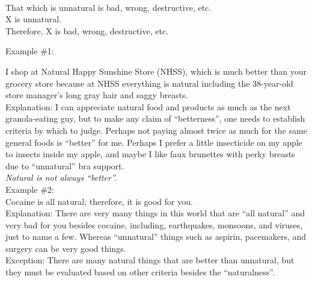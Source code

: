 \documentclass[a4paper,12pt,single,pdftex]{scrartcl}
\begin{document}
    \\

    
      That which is unnatural is bad, wrong, destructive, etc.
    \\

    
      X is unnatural.
    \\

    
      Therefore, X is bad, wrong, destructive, etc.
    \\

    
       \newline

      Example \#1: \newline
 \newline


      
        I shop at Natural Happy Sunshine Store (NHSS), which is much better than your grocery store because at NHSS everything is natural including the 38-year-old store manager’s long gray hair and saggy breasts.
      \\

      
        Explanation: I can appreciate natural food and products as much as the next granola-eating guy, but to make any claim of “betterness”, one needs to establish criteria by which to judge.  Perhaps not paying almost twice as much for the same general foods is “better” for me.  Perhaps I prefer a little insecticide on my apple to insects inside my apple, and maybe I like faux brunettes with perky breasts due to “unnatural” bra support.
      \\

      
        {\it Natural is not always “better”.}
      \\

      
        Example \#2:
      \\

      
        Cocaine is all natural; therefore, it is good for you.
      \\

      
        Explanation: There are very many things in this world that are “all natural” and very bad for you besides cocaine, including, earthquakes, monsoons, and viruses, just to name a few.  Whereas “unnatural” things such as aspirin, pacemakers, and surgery can be very good things.
      \\

      
        Exception: There are many natural things that are better than unnatural, but they must be evaluated based on other criteria besides the “naturalness”.
      \\
\end{document}
